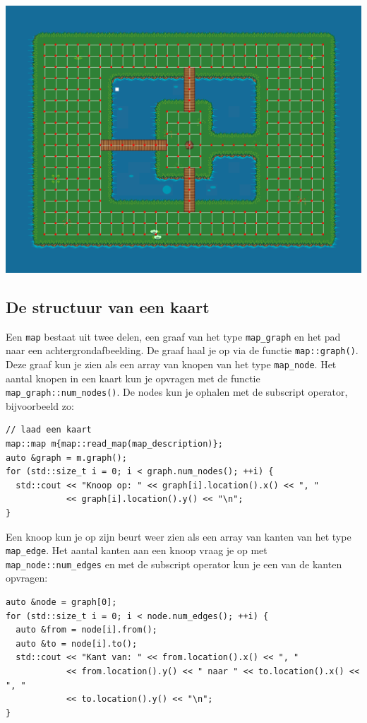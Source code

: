 \documentclass[11pt]{article}
\begin{document}
\begin{center}
\includegraphics[width=.9\linewidth]{./resources/screenshot.png}
\end{center}

\subsection{De structuur van een kaart}
\label{sec:orgbf83952}
Een \texttt{map} bestaat uit twee delen, een graaf van het type \texttt{map\_graph} en het
pad naar een achtergrondafbeelding. De graaf haal je op via de functie
\texttt{map::graph()}. Deze graaf kun je zien als een array van knopen van het
type \texttt{map\_node}. Het aantal knopen in een kaart kun je opvragen met de
functie \texttt{map\_graph::num\_nodes()}. De nodes kun je ophalen met de subscript
operator, bijvoorbeeld zo:
\begin{verbatim}
// laad een kaart
map::map m{map::read_map(map_description)};
auto &graph = m.graph();
for (std::size_t i = 0; i < graph.num_nodes(); ++i) {
  std::cout << "Knoop op: " << graph[i].location().x() << ", "
            << graph[i].location().y() << "\n";
}
\end{verbatim}

Een knoop kun je op zijn beurt weer zien als een array van kanten van het
type \texttt{map\_edge}. Het aantal kanten aan een knoop vraag je op met
\texttt{map\_node::num\_edges} en met de subscript operator kun je een van de kanten opvragen:
\begin{verbatim}
auto &node = graph[0];
for (std::size_t i = 0; i < node.num_edges(); ++i) {
  auto &from = node[i].from();
  auto &to = node[i].to();
  std::cout << "Kant van: " << from.location().x() << ", "
            << from.location().y() << " naar " << to.location().x() << ", "
            << to.location().y() << "\n";
}
\end{verbatim}
\end{document}
